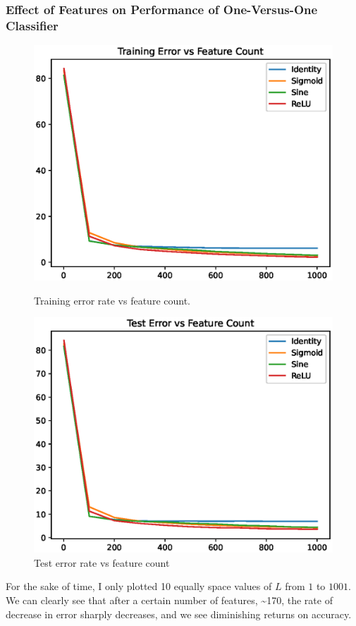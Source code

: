 \documentclass{article}
\begin{document}
\subsubsection{Effect of Features on Performance of One-Versus-One Classifier}
\begin{figure}[h!]
    \centering
    \begin{minipage}{0.5\textwidth}
        \centering
        \includegraphics[width=\textwidth]{images/one_vs_one_training_error_vs_features.eps}
        \caption{Training error rate vs feature count.}
    \end{minipage}\hfill
    \begin{minipage}{0.5\textwidth}
        \centering
        \includegraphics[width=\textwidth]{images/one_vs_one_test_error_vs_features.eps}
        \caption{Test error rate vs feature count}
    \end{minipage}
\end{figure}
For the sake of time, I only plotted 10 equally space values of $L$ from $1$ to $1001$.
We can clearly see that after a certain number of features, \textasciitilde170, the rate of decrease in error sharply decreases, and we see diminishing returns on accuracy.
\end{document}
